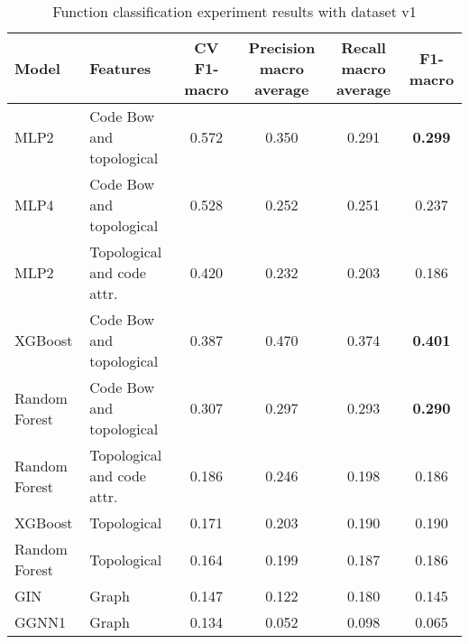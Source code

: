 \begin{table}[H]
\centering
{\footnotesize
 \begin{tabular}{|llcccc|}
\hline
                   Model &               Features &  CV F1-macro &  Precision macro average &  Recall macro average &  F1-macro \\
\hline

MLP2 &   Code Bow and topological &     0.572 &                    0.350 &                 0.291 &     \textbf{0.299} \\

MLP4 &   Code Bow and topological &     0.528 &                    0.252 &                 0.251 &     0.237 \\

MLP2 &    Topological and code attr. &     0.420 &                    0.232 &                 0.203 &     0.186 \\

XGBoost &   Code Bow and topological &     0.387 &                    0.470 &                 0.374 &     \textbf{0.401} \\
                    
Random Forest &   Code Bow and topological &     0.307 &                    0.297 &                 0.293 &     \textbf{0.290} \\

Random Forest &    Topological and code attr. &     0.186 &                    0.246 &                 0.198 &     0.186 \\



XGBoost &           Topological &     0.171 &                    0.203 &                 0.190 &     0.190 \\



Random Forest  &           Topological&     0.164 &                    0.199 &                 0.187 &     0.186 \\


GIN &                  Graph &     0.147 &                    0.122 &                 0.180 &     0.145 \\



GGNN1 &                  Graph &     0.134 &                    0.052 &                 0.098 &     0.065 \\



\hline
\end{tabular}
}\label{FN_exp_v3}\caption{Function classification experiment results with dataset v1}
\end{table}